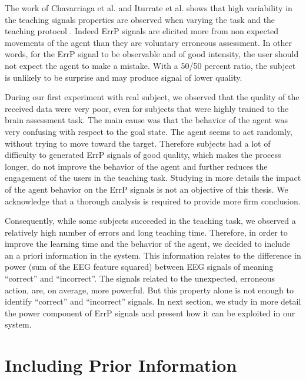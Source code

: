 The work of Chavarriaga et al. and Iturrate et al. shows that high variability in the teaching signals properties are observed when varying the task and the teaching protocol \cite{chavarriaga2010learning, iturrate2013task}. Indeed ErrP signals are elicited more from non expected movements of the agent than they are voluntary erroneous assessment. In other words, for the ErrP signal to be observable and of good intensity, the user should not expect the agent to make a mistake. With a 50/50 percent ratio, the subject is unlikely to be surprise and may produce signal of lower quality.

During our first experiment with real subject, we observed that the quality of the received data were very poor, even for subjects that were highly trained to the brain assessment task. The main cause was that the behavior of the agent was very confusing with respect to the goal state. The agent seems to act randomly, without trying to move toward the target. Therefore subjects had a lot of difficulty to generated ErrP signals of good quality, which makes the process longer, do not improve the behavior of the agent and further reduces the engagement of the users in the teaching task. Studying in more details the impact of the agent behavior on the ErrP signals is not an objective of this thesis. We acknowledge that a thorough analysis is required to provide more firm conclusion.

Consequently, while some subjects succeeded in the teaching task, we observed a relatively high number of errors and long teaching time. Therefore, in order to improve the learning time and the behavior of the agent, we decided to include an a priori information in the system. This information relates to the difference in power (sum of the EEG feature squared) between EEG signals of meaning ``correct'' and ``incorrect''. The signals related to the unexpected, erroneous action, are, on average, more powerful. But this property alone is not enough to identify ``correct'' and ``incorrect'' signals. In next section, we study in more detail the power component of ErrP signals and present how it can be exploited in our system.

\section{Including Prior Information}
\label{chapter:bci:priorpower}


